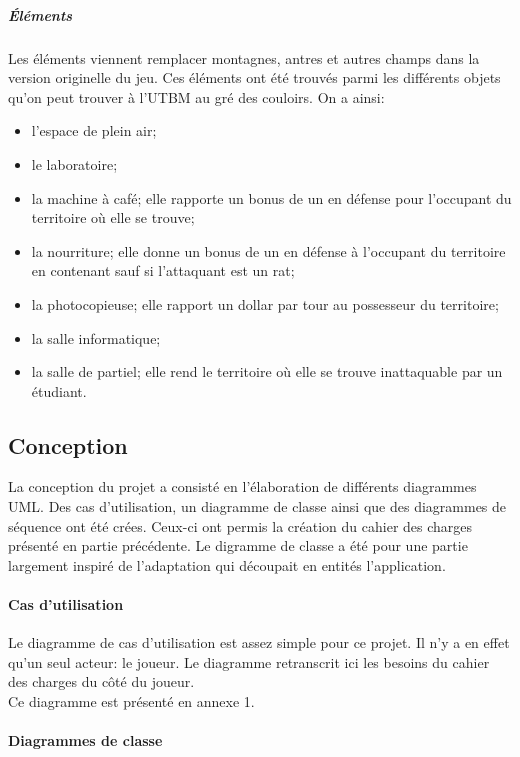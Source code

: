 \documentclass[a4paper, 11pt]{article}
\begin{document}
		\subparagraph{Éléments}
		Les éléments viennent remplacer montagnes, antres et autres champs dans la version originelle du jeu. Ces éléments ont été trouvés parmi les différents objets qu'on peut trouver à l'UTBM au gré des couloirs. On a ainsi:
		\begin{itemize}
			\item l'espace de plein air;
			\item le laboratoire;
			\item la machine à café; elle rapporte un bonus de un en défense pour l'occupant du territoire où elle se trouve;
			\item la nourriture; elle donne un bonus de un en défense à l'occupant du territoire en contenant sauf si l'attaquant est un rat;
			\item la photocopieuse; elle rapport un dollar par tour au possesseur du territoire;
			\item la salle informatique;
			\item la salle de partiel; elle rend le territoire où elle se trouve inattaquable par un étudiant.
		\end{itemize}
		
		
		\subsection{Conception}
		
		La conception du projet a consisté en l'élaboration de différents diagrammes UML. Des cas d'utilisation, un diagramme de classe ainsi que des diagrammes de séquence ont été crées. Ceux-ci ont permis la création du cahier des charges présenté en partie précédente. Le digramme de classe a été pour une partie largement inspiré de l'adaptation qui découpait en entités l'application.
		
			\paragraph{Cas d'utilisation\\}
			
			Le diagramme de cas d'utilisation est assez simple pour ce projet. Il n'y a en effet qu'un seul acteur: le joueur. Le diagramme retranscrit ici les besoins du cahier des charges du côté du joueur. \\
			Ce diagramme est présenté en annexe 1.
			
			\paragraph{Diagrammes de classe\\}
			
\end{document}
